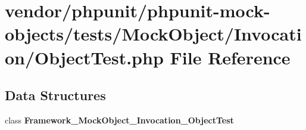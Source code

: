 \section{vendor/phpunit/phpunit-\/mock-\/objects/tests/\+Mock\+Object/\+Invocation/\+Object\+Test.php File Reference}
\label{_object_test_8php}
\subsection*{Data Structures}
\begin{DoxyCompactItemize}
\item 
class {\bf Framework\+\_\+\+Mock\+Object\+\_\+\+Invocation\+\_\+\+Object\+Test}
\end{DoxyCompactItemize}
